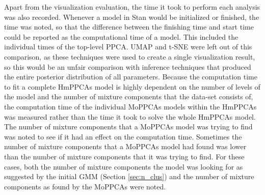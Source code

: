 Apart from the visualization evaluation, the time it took to perform each analysis was also recorded. Whenever a model in Stan would be initialized or finished, the time was noted, so that the difference between the finishing time and start time could be reported as the computational time of a model. This included the individual times of the top-level PPCA. UMAP and t-SNE were left out of this comparison, as these techniques were used to create a single visualization result, so this would be an unfair comparison with inference techniques that produced the entire posterior distribution of all parameters. Because the computation time to fit a complete HmPPCAs model is highly dependent on the number of levels of the model and the number of mixture components that the data-set consists of, the computation time of the individual MoPPCAs models within the HmPPCAs was measured rather than the time it took to solve the whole HmPPCAs model. The number of mixture components that a MoPPCAs model was trying to find was noted to see if it had an effect on the computation time. Sometimes the number of mixture components that a MoPPCAs model had found was lower than the number of mixture components that it was trying to find. For these cases, both the number of mixture components the model was looking for as suggested by the initial GMM (Section \ref{sec:n_clus}) and the number of mixture components as found by the MoPPCAs were noted.
